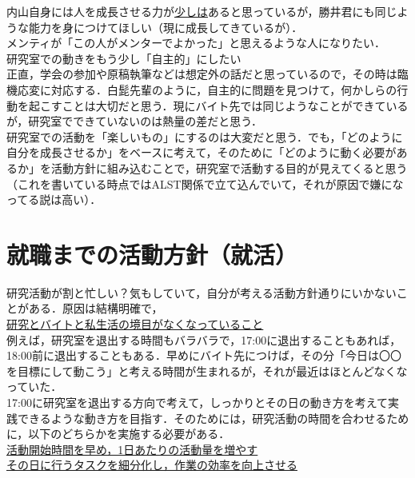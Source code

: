 \documentclass[a4paper,12pt]{ltjsarticle}
\begin{document}
  内山自身には人を成長させる力が\underline{少しは}あると思っているが，勝井君にも同じような能力を身につけてほしい（現に成長してきているが）．\\

  メンティが「この人がメンターでよかった」と思えるような人になりたい．\\

  研究室での動きをもう少し「自主的」にしたい\\

  正直，学会の参加や原稿執筆などは想定外の話だと思っているので，その時は臨機応変に対応する．白髭先輩のように，自主的に問題を見つけて，何かしらの行動を起こすことは大切だと思う．現にバイト先では同じようなことができているが，研究室でできていないのは熱量の差だと思う．\\

  研究室での活動を「楽しいもの」にするのは大変だと思う．でも，「どのように自分を成長させるか」をベースに考えて，そのために「どのように動く必要があるか」を活動方針に組み込むことで，研究室で活動する目的が見えてくると思う（これを書いている時点ではALST関係で立て込んでいて，それが原因で嫌になってる説は高い）．\\

  \clearpage

  \section{就職までの活動方針（就活）}
  研究活動が割と忙しい？気もしていて，自分が考える活動方針通りにいかないことがある．原因は結構明確で，\\

  \underline{研究とバイトと私生活の境目がなくなっていること}\\

  例えば，研究室を退出する時間もバラバラで，17:00に退出することもあれば，18:00前に退出することもある．早めにバイト先につけば，その分「今日は〇〇を目標にして動こう」と考える時間が生まれるが，それが最近はほとんどなくなっていた．\\

  17:00に研究室を退出する方向で考えて，しっかりとその日の動き方を考えて実践できるような動き方を目指す．そのためには，研究活動の時間を合わせるために，以下のどちらかを実施する必要がある．\\

  \underline{活動開始時間を早め，1日あたりの活動量を増やす}\\
  
  \underline{その日に行うタスクを細分化し，作業の効率を向上させる}\\
\end{document}
